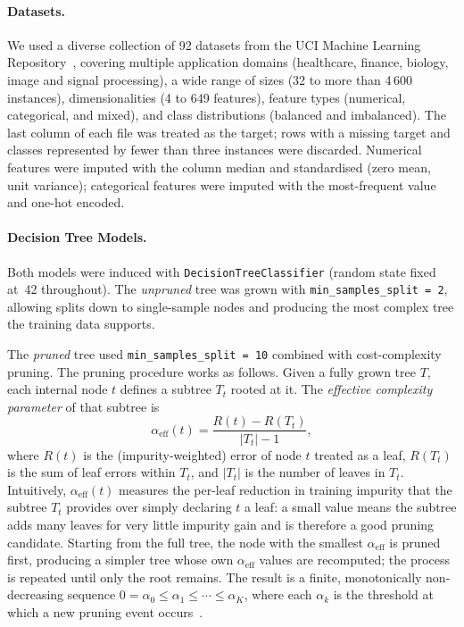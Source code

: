 \documentclass[runningheads]{llncs}
\begin{document}
\paragraph{Datasets.}
We used a diverse collection of 92 datasets from the UCI Machine Learning Repository~\cite{UCI2025}, covering multiple application domains (healthcare, finance, biology, image and signal processing), a wide range of sizes (32 to more than 4\,600 instances), dimensionalities (4 to 649 features), feature types (numerical, categorical, and mixed), and class distributions (balanced and imbalanced). The last column of each file was treated as the target; rows with a missing target and classes represented by fewer than three instances were discarded. Numerical features were imputed with the column median and standardised (zero mean, unit variance); categorical features were imputed with the most-frequent value and one-hot encoded.

\paragraph{Decision Tree Models.}
Both models were induced with \texttt{DecisionTreeClassifier}
(random state fixed at~42 throughout). The \emph{unpruned} tree was grown with \texttt{min\_samples\_split\,=\,2}, allowing splits down to single-sample nodes and producing the most complex tree the training data supports.

The \emph{pruned} tree used \texttt{min\_samples\_split\,=\,10} combined with cost-complexity pruning. The pruning procedure works as follows. Given a fully grown tree $T$, each internal node $t$ defines a subtree $T_t$ rooted at it. The \emph{effective complexity parameter} of that subtree is
\begin{equation}
  \alpha_{\mathrm{eff}}(t)
    = \frac{R(t) - R(T_t)}{\lvert T_t \rvert - 1},
  \label{eq:ccp}
\end{equation}
where $R(t)$ is the (impurity-weighted) error of node $t$ treated as a leaf, $R(T_t)$ is the sum of leaf errors within $T_t$, and $\lvert T_t \rvert$ is the number of leaves in $T_t$. Intuitively, $\alpha_{\mathrm{eff}}(t)$ measures the per-leaf reduction in training impurity that the subtree $T_t$ provides over simply declaring $t$ a leaf: a small value means the subtree adds many leaves for very little impurity gain and is therefore a good pruning candidate. Starting from the full tree, the node with the smallest $\alpha_{\mathrm{eff}}$ is pruned first, producing a simpler tree whose own $\alpha_{\mathrm{eff}}$ values are recomputed; the process is repeated until only the root remains. The result is a finite, monotonically non-decreasing sequence $0 = \alpha_0 \le \alpha_1 \le \cdots \le \alpha_K$, where each $\alpha_k$ is the threshold at which a new pruning event occurs~\cite{Aggarwal2015}.
\end{document}
